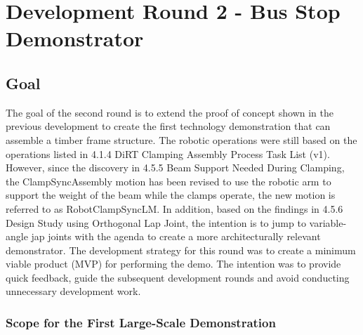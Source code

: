 \chapter{Development Round 2 - Bus Stop Demonstrator}

\section{Goal}

The goal of the second round is to extend the proof of concept shown in the previous development to create the first technology demonstration that can assemble a timber frame structure. The robotic operations were still based on the operations listed in 4.1.4 DiRT Clamping Assembly Process Task List (v1). However, since the discovery in 4.5.5 Beam Support Needed During Clamping, the ClampSyncAssembly motion has been revised to use the robotic arm to support the weight of the beam while the clamps operate, the new motion is referred to as RobotClampSyncLM.
In addition, based on the findings in 4.5.6 Design Study using Orthogonal Lap Joint, the intention is to jump to variable-angle jap joints with the agenda to create a more architecturally relevant demonstrator. 
The development strategy for this round was to create a minimum viable product (MVP) for performing the demo. The intention was to provide quick feedback, guide the subsequent development rounds and avoid conducting unnecessary development work. 

\subsection{Scope for the First Large-Scale Demonstration}

